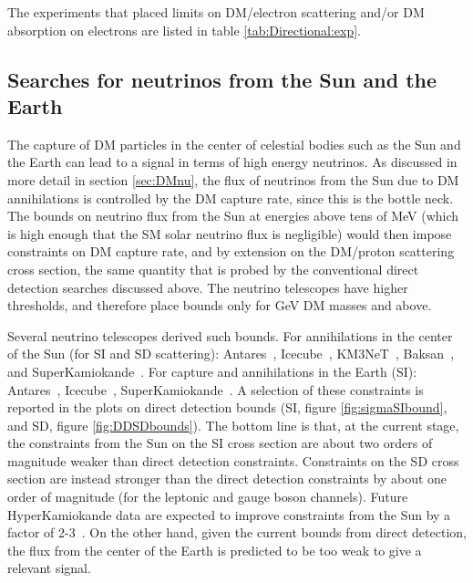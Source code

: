 The experiments that placed limits on DM/electron scattering and/or DM absorption on electrons are listed in table \ref{tab:Directional:exp}.




\subsection{Searches for neutrinos from the Sun and the Earth}\label{sec:DMnustatus}

The capture of DM particles in the center of celestial bodies such as the Sun and the Earth can lead to a signal in terms of high energy neutrinos. As discussed in more detail in section \ref{sec:DMnu}, the flux of neutrinos from the Sun due to DM annihilations is controlled by the DM capture rate, since this is the bottle neck. 
The bounds on neutrino flux from the Sun at energies above tens of MeV (which is high enough that the SM solar neutrino flux is negligible) 
would then impose constraints on DM capture rate, and by extension on the DM/proton scattering cross section, the same quantity that is probed by the conventional direct detection searches discussed above. The neutrino telescopes have higher thresholds,  and therefore place bounds only for GeV DM masses and above.

\medskip

Several neutrino telescopes derived such bounds.
For annihilations in the center of the Sun (for SI and SD scattering): {\sc Antares}~\cite{1603.02228}, {\sc Icecube}~\cite{1612.05949,ColomiBernadich:2019upo,2111.09970}, {\sc KM3NeT}~\cite{KM3NeT:2024xca},
{\sc Baksan}~\cite{1301.1138},
and {\sc SuperKamiokande}~\cite{1503.04858}.
For capture and annihilations in the Earth (SI): {\sc Antares}~\cite{1612.06792},
{\sc Icecube}~\cite{1609.01492},
{\sc SuperKamiokande}~\cite{hep-ex/0404025}.
A selection of these constraints is reported in the plots on direct detection bounds (SI, figure \ref{fig:sigmaSIbound}, and SD, figure \ref{fig:DDSDbounds}). 
The bottom line is that, at the current stage, the constraints from the Sun on the SI cross section are about two orders of magnitude weaker than direct detection constraints. Constraints on the SD cross section are instead stronger than the direct detection constraints by about one order of magnitude (for the leptonic and gauge boson channels).
Future   {\sc HyperKamiokande} data are expected to improve constraints from the Sun by a factor of 2-3~\cite{Bell:2021esh}.
On the other hand, given the current bounds from direct detection, the flux from the center of the Earth is predicted to be too weak to give a relevant signal. 

